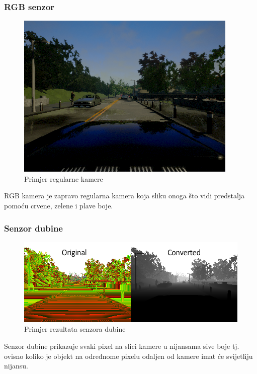\subsubsection{RGB senzor}
\begin{figure}[ht!]
  \centering
  \includegraphics[scale=0.5]{images/rgb_example.png}
  \caption{Primjer regularne kamere}
  \label{fig:rgb_exmaple}
\end{figure}

RGB kamera je zapravo regularna kamera koja sliku onoga što vidi predstalja pomoću crvene, zelene i plave boje.

\subsubsection{Senzor dubine}
\begin{figure}[ht!]
  \centering
  \includegraphics[scale=0.5]{images/depth_example.png}
  \caption{Primjer rezultata senzora dubine}
  \label{fig:depth_exmaple}
\end{figure}

Senzor dubine prikazuje svaki pixel na slici kamere u nijansama sive boje tj. ovisno koliko je objekt na određnome pixelu odaljen od kamere imat će svijetliju nijansu.

\newpage
